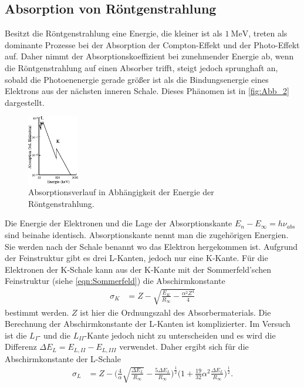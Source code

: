 
\subsection{Absorption von Röntgenstrahlung} %
\label{sub:Absorption}

Besitzt die Röntgenstrahlung eine Energie, die kleiner ist als $\qty{1}{\mega\electronvolt}$, treten als dominante Prozesse bei der
Absorption der Compton-Effekt und der Photo-Effekt auf. Daher nimmt der Absorptionskoeffizient bei zunehmender Energie ab, wenn die
Röntgenstrahlung auf einen Absorber trifft, steigt jedoch sprunghaft an, sobald die Photoenenergie gerade größer ist als die
Bindungsenergie eines Elektrons aus der nächsten inneren Schale. Dieses Phänomen ist in \autoref{fig:Abb_2} dargestellt.
\begin{figure}[H]
    \centering
    \includegraphics[width=0.2\textwidth]{build/Abb_2.pdf}
    \caption{Absorptionsverlauf in Abhängigkeit der Energie der Röntgenstrahlung.\cite{V602}}
    \label{fig:Abb_2}
\end{figure}
Die Energie der Elektronen und die Lage der Absorptionskante $E_n - E_\infty = h \nu_{abs}$ sind beinahe identisch. Absorptionskante
nennt man die zugehörigen Energien. Sie werden nach der Schale benannt wo das Elektron hergekommen ist.
Aufgrund der Feinstruktur gibt es drei L-Kanten, jedoch nur eine K-Kante.
Für die Elektronen der K-Schale kann aus der K-Kante mit der Sommerfeld'schen Feinstruktur (siehe \autoref{eqn:Sommerfeld}) die
Abschirmkonstante
\begin{align}
    \sigma_K &= Z - \sqrt{\frac{E_K}{R_\infty} - \frac{\alpha^2 Z^4}{4}} \label{eqn:sigmak}
\end{align}
bestimmt werden. $Z$ ist hier die Ordnungszahl des Absorbermaterials.
Die Berechnung der Abschirmkonstante der L-Kanten ist komplizierter.
Im Versuch ist die $L_I$- und die $L_{II}$-Kante jedoch nicht zu unterscheiden und es wird die Differenz $\Delta E_L = E_{L,II} - E_{L,III}$
verwendet.
Daher ergibt sich für die Abschirmkonstante der L-Schale
\begin{align}
    \sigma_L &=  Z - \bigl(\frac{4}{\alpha} \sqrt{\frac{\Delta E_L}{R_\infty}}-\frac{5 \Delta E_L}{R_\infty}\bigr)^{\frac{1}{2}}
    \bigl(1 + \frac{19}{32} \alpha^2 \frac{\Delta E_L}{R_\infty} \bigr)^{\frac{1}{2}}. \label{eqn:sigmal}
\end{align}

